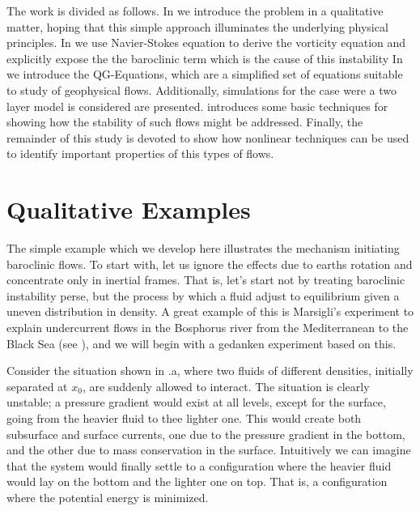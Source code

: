 The work is divided as follows. In  we introduce the
problem in a qualitative matter, hoping that this simple approach
illuminates the underlying physical principles. In 
we use Navier-Stokes equation to derive the vorticity equation and
explicitly expose the the baroclinic term which is the cause of this
instability
In  we
introduce the QG-Equations, which are a simplified set of equations
suitable to study of geophysical flows. Additionally, simulations for
the case were a two layer model is considered are presented.  
introduces some basic techniques for showing how the stability of such
flows might be addressed. Finally, the remainder of this study is devoted to
show how nonlinear techniques can be used to identify important
properties of this types of flows.

\section{Qualitative Examples}
\label{s:examples}

The simple example which we develop here illustrates the mechanism
initiating baroclinic flows. To start with, let us ignore the effects due
to earths rotation and concentrate only in inertial frames. That is,
let's start not by treating baroclinic instability perse, but the process
by which a fluid adjust to equilibrium given a uneven distribution in
density. A great example of this is Marsigli's experiment to explain
undercurrent flows in the Bosphorus river from the Mediterranean to the
Black Sea (see ), and we will begin with a gedanken
experiment based on this.

Consider the situation shown in .a, where two fluids
of different densities, initially separated at $x_0$, are suddenly
allowed to interact. The situation is clearly unstable; a pressure
gradient would exist at all levels, except for the surface, going from
the heavier fluid to thee lighter one. This would create both subsurface
and surface currents, one due to the pressure gradient in the bottom, and
the other due to mass conservation in the surface. Intuitively we can
imagine that the system would finally settle to a configuration where the
heavier fluid would lay on the bottom and the lighter one on top. That
is, a configuration where the potential energy is minimized.

